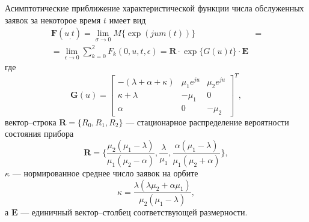 \begin{theorem}
	Асимптотические приближение характеристической функции числа обслуженных заявок за некоторое время $t$ имеет вид
	\begin{equation*} \label{theorem_summary}
		\begin{split}
			\boldsymbol{F}(u_,t) =  \lim_{\sigma \xrightarrow{} 0} M\{\exp(jum(t))\} &= 
			\\
			= \lim_{\epsilon \xrightarrow{} 0} \sum_{k=0}^{2}F_{k}(0,u,t,\epsilon) = \boldsymbol{R} \cdot \exp\{G(u)t\} \cdot \boldsymbol{E}
		\end{split}
	\end{equation*}
	где 
	\begin{equation*}
		\boldsymbol{G}(u)=\begin{bmatrix}
			-(\lambda + \alpha + \kappa) & \mu_{1}e^{ju} &  \mu_{2}e^{ju}\\
			\kappa+\lambda & -\mu_{1} & 0\\
			\alpha & 	0 &	-\mu_{2}
		\end{bmatrix}^{T},
	\end{equation*}
	вектор--строка $\boldsymbol{R}=\{R_{0},R_{1},R_{2}\}$ --- стационарное распределение вероятности состояния прибора
	\begin{equation*}
		\boldsymbol{R}=\{\frac{\mu_{2}(\mu_{1} - \lambda)}{\mu_{1}(\mu_{2} - \alpha)},\frac{\lambda}{\mu_{1}},\frac{\alpha(\mu_{1} - \lambda)}{\mu_{1}(\mu_{2} + \alpha)}\},
	\end{equation*}
	$\kappa$ --- нормированное среднее число заявок на орбите
	\begin{equation*}
		\kappa = \frac{\lambda(\lambda \mu_{2} + \alpha \mu_{1})}{\mu_{2}(\mu_{1} - \lambda)},
	\end{equation*}
	а $\boldsymbol{E}$ --- единичный вектор--столбец соответствующей размерности.
\end{theorem}
